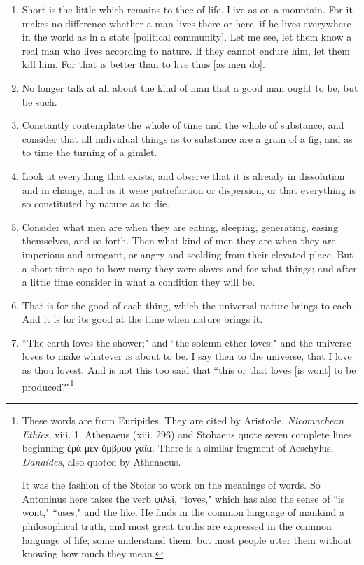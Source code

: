 \begin{enumerate}
\item Short is the little which remains to thee of life. Live as on a mountain. For it makes no difference whether a man lives there or here, if he lives everywhere in the world as in a state [{\clarify political community}]. Let me see, let them know a real man who lives according to nature. If they cannot endure him, let them kill him. For that is better than to live thus [{\clarify as men do}].

\item No longer talk at all about the kind of man that a good man ought to be, but be such.

\item Constantly contemplate the whole of time and the whole of substance, and consider that all individual things as to substance are a grain of a fig, and as to time the turning of a gimlet.

\item Look at everything that exists, and observe that it is already in dissolution and in change, and as it were putrefaction or dispersion, or that everything is so constituted by nature as to die.

\item Consider what men are when they are eating, sleeping, generating, easing themselves, and so forth. Then what kind of men they are when they are imperious and arrogant, or angry and scolding from their elevated place. But a short time ago to how many they were slaves and for what things; and after a little time consider in what a condition they will be.

\item That is for the good of each thing, which the universal nature brings to each. And it is for its good at the time when nature brings it.

\item ``The earth loves the shower;" and ``the solemn ether loves;" and the universe loves to make whatever is about to be. I say then to the universe, that I love as thou lovest. And is not this too said that ``this or that loves [{\clarify is wont}] to be produced?"\footnote{These words are from Euripides. They are cited by Aristotle, \textit{Nicomachean Ethics}, viii. 1. Athenaeus (xiii. 296) and Stobaeus quote seven complete lines beginning \textgreek{ἐρά μὲν ὄμβρου γαῖα}. There is a similar fragment of Aeschylus, \textit{Danaides}, also quoted by Athenaeus.

It was the fashion of the Stoics to work on the meanings of words. So Antoninus here takes the verb \textgreek{φιλεῖ}, ``loves," which has also the sense of ``is wont," ``uses," and the like. He finds in the common language of mankind a philosophical truth, and most great truths are expressed in the common language of life; some understand them, but most people utter them without knowing how much they mean.}


\end{enumerate}
